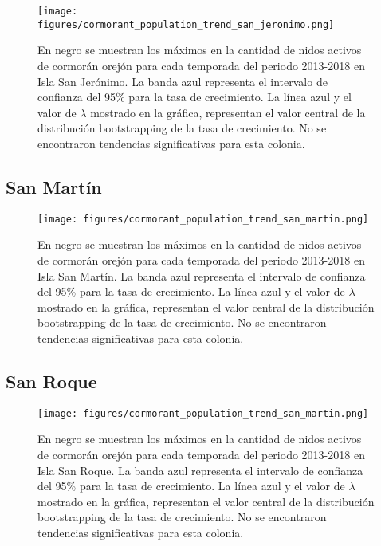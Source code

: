 \documentclass{article} %
\begin{document}
\begin{figure}[H]
\hspace{-2cm}
    \texttt{[image: figures/cormorant\_population\_trend\_san\_jeronimo.png]}
\caption{En negro se muestran los máximos en la cantidad de nidos activos de cormorán orejón para cada temporada del periodo 2013-2018 en Isla San Jerónimo. La banda azul representa el intervalo de confianza del 95\% para la tasa de crecimiento. La línea azul y el valor de $\lambda$ mostrado en la gráfica, representan el valor central de la distribución bootstrapping de la tasa de crecimiento. No se encontraron tendencias significativas para esta colonia.}
\end{figure}

\subsection*{San Martín}

\begin{figure}[H]
\hspace{-2cm}
    \texttt{[image: figures/cormorant\_population\_trend\_san\_martin.png]}
\caption{En negro se muestran los máximos en la cantidad de nidos activos de cormorán orejón para cada temporada del periodo 2013-2018 en Isla San Martín. La banda azul representa el intervalo de confianza del 95\% para la tasa de crecimiento. La línea azul y el valor de $\lambda$ mostrado en la gráfica, representan el valor central de la distribución bootstrapping de la tasa de crecimiento. No se encontraron tendencias significativas para esta colonia.}
\end{figure}

\subsection*{San Roque}

\begin{figure}[H]
\hspace{-2cm}
    \texttt{[image: figures/cormorant\_population\_trend\_san\_martin.png]}
\caption{En negro se muestran los máximos en la cantidad de nidos activos de cormorán orejón para cada temporada del periodo 2013-2018 en Isla San Roque. La banda azul representa el intervalo de confianza del 95\% para la tasa de crecimiento. La línea azul y el valor de $\lambda$ mostrado en la gráfica, representan el valor central de la distribución bootstrapping de la tasa de crecimiento. No se encontraron tendencias significativas para esta colonia.}
\end{figure}
\end{document}
